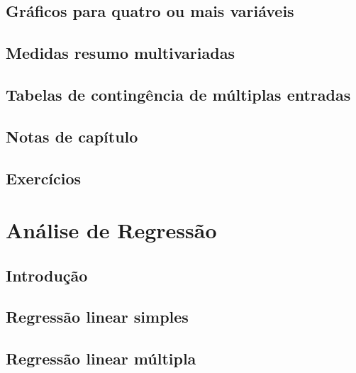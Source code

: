 \documentclass[
]{latex/krantz}
\theoremstyle{definition}
\theoremstyle{definition}
\theoremstyle{definition}
\theoremstyle{definition}
\theoremstyle{remark}
\begin{document}
\hypertarget{gruxe1ficos-para-quatro-ou-mais-variuxe1veis}{%
\section{Gráficos para quatro ou mais variáveis}\label{gruxe1ficos-para-quatro-ou-mais-variuxe1veis}}

\hypertarget{medidas-resumo-multivariadas}{%
\section{Medidas resumo multivariadas}\label{medidas-resumo-multivariadas}}

\hypertarget{tabelas-de-continguxeancia-de-muxfaltiplas-entradas}{%
\section{Tabelas de contingência de múltiplas entradas}\label{tabelas-de-continguxeancia-de-muxfaltiplas-entradas}}

\hypertarget{notas-de-capuxedtulo-3}{%
\section{Notas de capítulo}\label{notas-de-capuxedtulo-3}}

\hypertarget{exercuxedcios-3}{%
\section{Exercícios}\label{exercuxedcios-3}}

\hypertarget{anuxe1lise-de-regressuxe3o}{%
\chapter{Análise de Regressão}\label{anuxe1lise-de-regressuxe3o}}

\hypertarget{introduuxe7uxe3o-4}{%
\section{Introdução}\label{introduuxe7uxe3o-4}}

\hypertarget{regressuxe3o-linear-simples}{%
\section{Regressão linear simples}\label{regressuxe3o-linear-simples}}

\hypertarget{regressuxe3o-linear-muxfaltipla}{%
\section{Regressão linear múltipla}\label{regressuxe3o-linear-muxfaltipla}}
\end{document}
